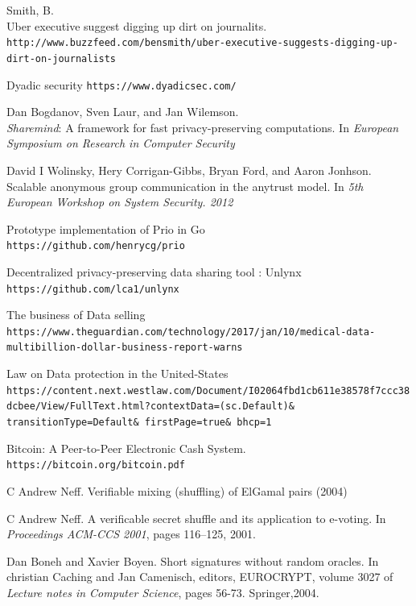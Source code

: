 \documentclass{article}
\begin{document}
\begin{thebibliography}{9}
Smith, B.\\
Uber executive suggest digging up dirt on journalits.
\\\texttt{http://www.buzzfeed.com/bensmith/uber-executive-suggests-digging-up-dirt-on-journalists}

Dyadic security \texttt{https://www.dyadicsec.com/}

Dan Bogdanov, Sven Laur, and Jan Wilemson.\\
\textit{Sharemind}: A framework for fast privacy-preserving computations. In \textit{European Symposium on Research in Computer Security}

David I Wolinsky, Hery Corrigan-Gibbs, Bryan Ford, and Aaron Jonhson.\\
Scalable anonymous group communication in the anytrust model. In \textit{5th European Workshop on System Security. 2012}


Prototype implementation of Prio in Go
\\\texttt{https://github.com/henrycg/prio}

Decentralized privacy-preserving data sharing tool : Unlynx\\
\texttt{https://github.com/lca1/unlynx}

The business of Data selling\\
\texttt{https://www.theguardian.com/technology/2017/jan/10/medical-data-multibillion-dollar-business-report-warns}

Law on Data protection in the United-States\\
\texttt{https://content.next.westlaw.com/Document/I02064fbd1cb611e38578f7ccc38dcbee/View/FullText.html?contextData=(sc.Default)\& transitionType=Default\& firstPage=true\& bhcp=1}


Bitcoin: A Peer-to-Peer Electronic Cash System.\\
\texttt{https://bitcoin.org/bitcoin.pdf}

C Andrew Neff. Verifiable mixing (shuffling) of ElGamal pairs (2004)

C Andrew Neff. A verificable secret shuffle and its application to e-voting. In \textit{Proceedings ACM-CCS 2001}, pages 116--125, 2001.

Dan Boneh and Xavier Boyen. Short signatures without random oracles. In christian Caching and Jan Camenisch, editors, EUROCRYPT, volume 3027 of \textit{Lecture notes in Computer Science}, pages 56-73. Springer,2004.


\end{thebibliography}
\end{document}
